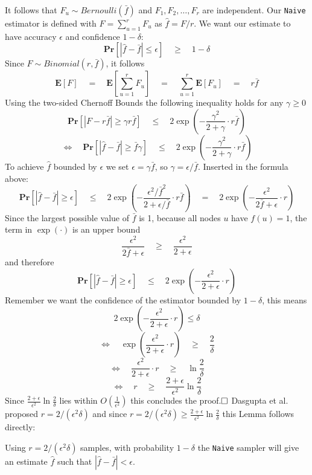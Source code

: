 It follows that $F_u \sim  Bernoulli(\bar{f})$ and $F_1, F_2, \ldots , F_r$ are independent.
Our \texttt{Naive} estimator is defined with $F = \sum_{u=1}^{r} F_u$ as $\hat{f} = F/r$.
We want our estimate to have accuracy $\epsilon$ and confidence $1-\delta$:
$$\textbf{Pr}[|\hat{f}-\bar{f} | \leq \epsilon] \quad\geq\quad 1-\delta$$
Since $F \sim Binomial(r,\bar{f})$, it follows
$$\textbf{E}[F] \quad=\quad \textbf{E}[\sum_{u=1}^{r} F_u] \quad=\quad \sum_{u=1}^{r}\textbf{E}[F_u] \quad=\quad r\bar{f}$$
Using the two-sided Chernoff Bounds the following inequality holds for any $\gamma \geq 0$
$$\textbf{Pr}[|F-r\bar{f}|\geq \gamma r\bar{f}] \quad\leq\quad 2\exp(-\frac{\gamma^2}{2+\gamma}\cdot r\bar{f})$$
$$\Leftrightarrow\quad \textbf{Pr}[|\hat{f}-\bar{f}|\geq \bar{f}\gamma] \quad\leq\quad 2\exp(-\frac{\gamma^2}{2+\gamma}\cdot r\bar{f})$$
To achieve $\hat{f}$ bounded by $\epsilon$ we set $\epsilon = \gamma\bar{f}$, so $\gamma = \epsilon/\bar{f}$. Inserted in the formula above:
$$\textbf{Pr}[|\hat{f}-\bar{f}| \geq \epsilon] \quad\leq\quad 2\exp (-\frac{\epsilon^2/\bar{f}^2}{2+\epsilon/\bar{f}}\cdot r\bar{f}) \quad=\quad 2\exp(-\frac{\epsilon^2}{2\bar{f}+\epsilon}\cdot r)$$
Since the largest possible value of $\bar{f}$ is 1, because all nodes $u$ have $f(u) = 1$, the term in $\exp(\cdot)$ is an upper bound
$$\frac{\epsilon^2}{2\bar{f}+\epsilon} \quad\geq\quad \frac{\epsilon^2}{2+\epsilon}$$
and therefore
$$\textbf{Pr}[|\hat{f}-\bar{f}| \geq \epsilon] \quad\leq\quad 2\exp(-\frac{\epsilon^2}{2+\epsilon}\cdot r)$$
Remember we want the confidence of the estimator bounded by $1-\delta$, this means
$$2\exp(-\frac{\epsilon^2}{2+\epsilon}\cdot r) \leq \delta$$
$$\Leftrightarrow\quad \exp(\frac{\epsilon^2}{2+\epsilon}\cdot r) \quad\geq\quad \frac{2}{\delta}$$
$$\Leftrightarrow\quad \frac{\epsilon^2}{2+\epsilon}\cdot r \quad\geq\quad \ln\frac{2}{\delta}$$
$$\Leftrightarrow\quad r \quad\geq\quad \frac{2+\epsilon}{\epsilon^2}\ln\frac{2}{\delta}$$
Since $\frac{2+\epsilon}{\epsilon^2}\ln\frac{2}{\delta}$ lies within $O(\frac{1}{\epsilon^2})$ this concludes the proof.$\hfill\square$
\newline\newline
Dasgupta et al. \cite{dasgupta2012social} proposed $r=2/(\epsilon^2\delta)$ and since $r=2/(\epsilon^2\delta) \geq \frac{2+\epsilon}{\epsilon^2}\ln\frac{2}{\delta}$ this Lemma follows directly:
\begin{lemma}
Using $r=2/(\epsilon^2\delta)$ samples, with probability $1-\delta$ the \texttt{Naive} sampler will give an estimate $\hat{f}$ such that $|\hat{f}-\bar{f}|< \epsilon$.
\end{lemma}
